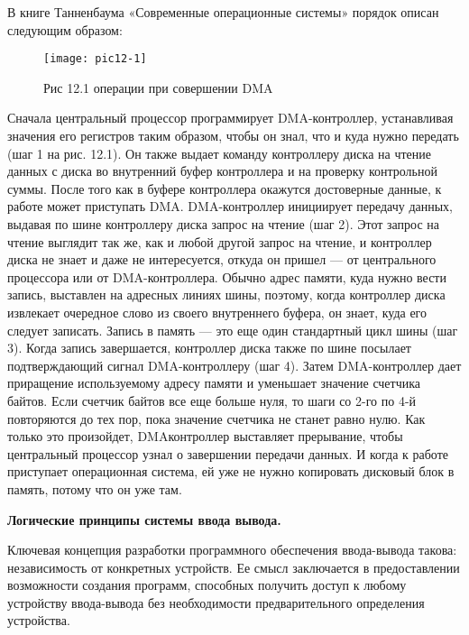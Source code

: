 В книге Танненбаума «Современные операционные системы» порядок описан следующим образом:

\begin{figure}[h]
  \begin{center}
  \texttt{[image: pic12-1]}
  \caption{Рис 12.1 операции при совершении DMA}
  \end{center}
\end{figure}

\newpage
Сначала центральный процессор программирует DMA-контроллер, устанавливая значения его регистров таким образом, чтобы он знал, что и куда нужно передать (шаг 1 на рис. 12.1). Он также выдает команду контроллеру диска на чтение данных с диска во внутренний буфер контроллера и на проверку контрольной суммы. После того как в буфере контроллера окажутся достоверные данные, к работе может приступать DMA. DMA-контроллер инициирует передачу данных, выдавая по шине контроллеру диска запрос на чтение (шаг 2). Этот запрос на чтение выглядит так же, как и любой другой запрос на чтение, и контроллер диска не знает и даже не интересуется, откуда он пришел — от центрального процессора или от DMA-контроллера. Обычно адрес памяти, куда нужно вести запись, выставлен на адресных линиях шины, поэтому, когда контроллер диска извлекает очередное слово из своего внутреннего буфера, он знает, куда его следует записать. Запись в память — это еще один стандартный цикл шины (шаг 3). Когда запись завершается, контроллер диска также по шине посылает подтверждающий сигнал DMA-контроллеру (шаг 4). Затем DMA-контроллер дает приращение используемому адресу памяти и уменьшает значение счетчика байтов. Если счетчик байтов все еще больше нуля, то шаги со 2-го по 4-й повторяются до тех пор, пока значение счетчика не станет равно нулю. Как только это произойдет, DMAконтроллер выставляет прерывание, чтобы центральный процессор узнал о завершении передачи данных. И когда к работе приступает операционная система, ей уже не нужно копировать дисковый блок в память, потому что он уже там.

\begin{center}{\bfseries Логические принципы системы ввода вывода.}
\end{center}

Ключевая концепция разработки программного обеспечения ввода-вывода такова: независимость от конкретных устройств. Ее смысл заключается в предоставлении возможности создания программ, способных получить доступ к любому устройству ввода-вывода без необходимости предварительного определения устройства. 

